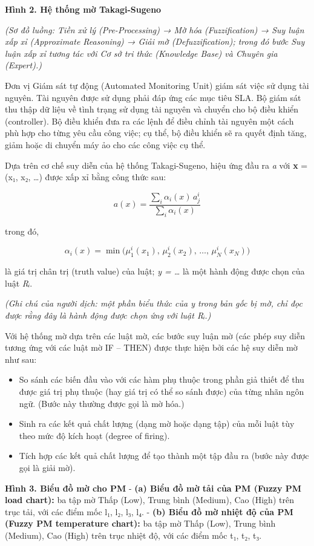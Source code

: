 \documentclass[
  vietnamese,
]{article}
\providecommand{\tightlist}{%
  \setlength{\itemsep}{0pt}\setlength{\parskip}{0pt}}
\begin{document}
\textbf{Hình 2. Hệ thống mờ Takagi-Sugeno}

\emph{(Sơ đồ luồng: Tiền xử lý (Pre-Processing) → Mờ hóa (Fuzzification)
→ Suy luận xấp xỉ (Approximate Reasoning) → Giải mờ (Defuzzification);
trong đó bước Suy luận xấp xỉ tương tác với Cơ sở tri thức (Knowledge
Base) và Chuyên gia (Expert).)}

Đơn vị Giám sát tự động (Automated Monitoring Unit) giám sát việc sử
dụng tài nguyên. Tài nguyên được sử dụng phải đáp ứng các mục tiêu SLA.
Bộ giám sát thu thập dữ liệu về tình trạng sử dụng tài nguyên và chuyển
cho bộ điều khiển (controller). Bộ điều khiển đưa ra các lệnh để điều
chỉnh tài nguyên một cách phù hợp cho từng yêu cầu công việc; cụ thể, bộ
điều khiển sẽ ra quyết định tăng, giảm hoặc di chuyển máy ảo cho các
công việc cụ thể.

Dựa trên cơ chế suy diễn của hệ thống Takagi-Sugeno, hiệu ứng đầu ra
\emph{a} với \textbf{x} = (x₁, x₂, \ldots) được xấp xỉ bằng công thức
sau:

\[a(x) = \frac{\sum_i \alpha_i(x)\, a^i_j}{\sum_i \alpha_i(x)} \tag{1}\]

trong đó,

\[\alpha_i(x) = \min\big(\mu^i_1(x_1),\, \mu^i_2(x_2),\, \dots,\, \mu^i_N(x_N)\big)\]

là giá trị chân trị (truth value) của luật; \emph{y = \ldots{}} là một
hành động được chọn của luật \emph{Rᵢ}.

\emph{(Ghi chú của người dịch: một phần biểu thức của y trong bản gốc bị
mờ, chỉ đọc được rằng đây là hành động được chọn ứng với luật Rᵢ.)}

Với hệ thống mờ dựa trên các luật mờ, các bước suy luận mờ (các phép suy
diễn tương ứng với các luật mờ IF -- THEN) được thực hiện bởi các hệ suy
diễn mờ như sau:

\begin{itemize}
\tightlist
\item
  So sánh các biến đầu vào với các hàm phụ thuộc trong phần giả thiết để
  thu được giá trị phụ thuộc (hay giá trị có thể so sánh được) của từng
  nhãn ngôn ngữ. (Bước này thường được gọi là mờ hóa.)
\item
  Sinh ra các kết quả chất lượng (dạng mờ hoặc dạng tập) của mỗi luật
  tùy theo mức độ kích hoạt (degree of firing).
\item
  Tích hợp các kết quả chất lượng để tạo thành một tập đầu ra (bước này
  được gọi là giải mờ).
\end{itemize}

\textbf{Hình 3. Biểu đồ mờ cho PM} - \textbf{(a) Biểu đồ mờ tải của PM
(Fuzzy PM load chart):} ba tập mờ Thấp (Low), Trung bình (Medium), Cao
(High) trên trục tải, với các điểm mốc l₁, l₂, l₃, l₄. - \textbf{(b)
Biểu đồ mờ nhiệt độ của PM (Fuzzy PM temperature chart):} ba tập mờ Thấp
(Low), Trung bình (Medium), Cao (High) trên trục nhiệt độ, với các điểm
mốc t₁, t₂, t₃.
\end{document}
